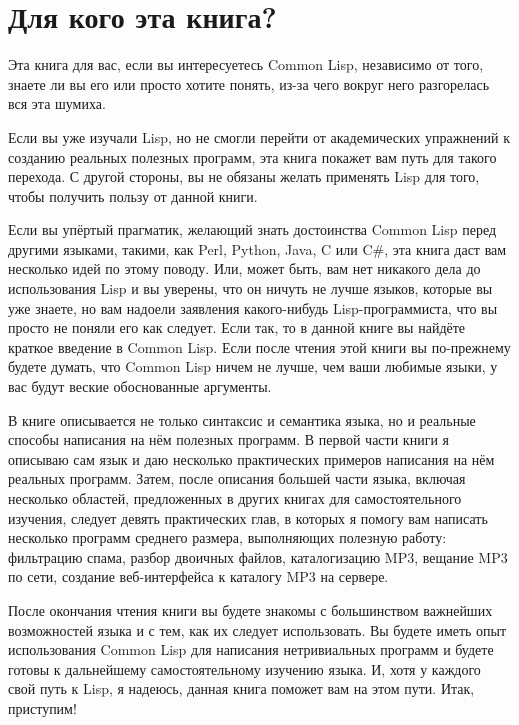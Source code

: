 \section{Для кого эта книга?}

Эта книга для вас, если вы интересуетесь Common Lisp, независимо от
того, знаете ли вы его или просто хотите понять, из-за чего вокруг него разгорелась вся
эта шумиха.

Если вы уже изучали Lisp, но не смогли перейти от академических упражнений к созданию
реальных полезных программ, эта книга покажет вам путь для такого перехода. С другой
стороны, вы не обязаны желать применять Lisp для того, чтобы получить пользу от данной
книги.

Если вы упёртый прагматик, желающий знать достоинства Common Lisp перед другими языками,
такими, как Perl, Python, Java, C или C\#, эта книга даст вам несколько идей по этому
поводу. Или, может быть, вам нет никакого дела до использования Lisp и вы уверены, что он
ничуть не лучше языков, которые вы уже знаете, но вам надоели заявления какого-нибудь
Lisp-программиста, что вы просто не поняли его как следует. Если так, то в данной книге вы
найдёте краткое введение в Common Lisp. Если после чтения этой книги вы по-прежнему будете
думать, что Common Lisp ничем не лучше, чем ваши любимые языки, у вас будут веские
обоснованные аргументы.

В книге описывается не только синтаксис и семантика языка, но и реальные способы написания
на нём полезных программ. В первой части книги я описываю сам язык и даю несколько
практических примеров написания на нём реальных программ. Затем, после описания большей
части языка, включая несколько областей, предложенных в других книгах для самостоятельного
изучения, следует девять практических глав, в которых я помогу вам написать несколько
программ среднего размера, выполняющих полезную работу: фильтрацию спама, разбор двоичных
файлов, каталогизацию MP3, вещание MP3 по сети, создание веб-интерфейса к каталогу MP3 на
сервере.

После окончания чтения книги вы будете знакомы с большинством важнейших возможностей языка
и с тем, как их следует использовать. Вы будете иметь опыт использования Common Lisp для
написания нетривиальных программ и будете готовы к дальнейшему самостоятельному изучению
языка. И, хотя у каждого свой путь к Lisp, я надеюсь, данная книга поможет вам на этом
пути. Итак, приступим!

